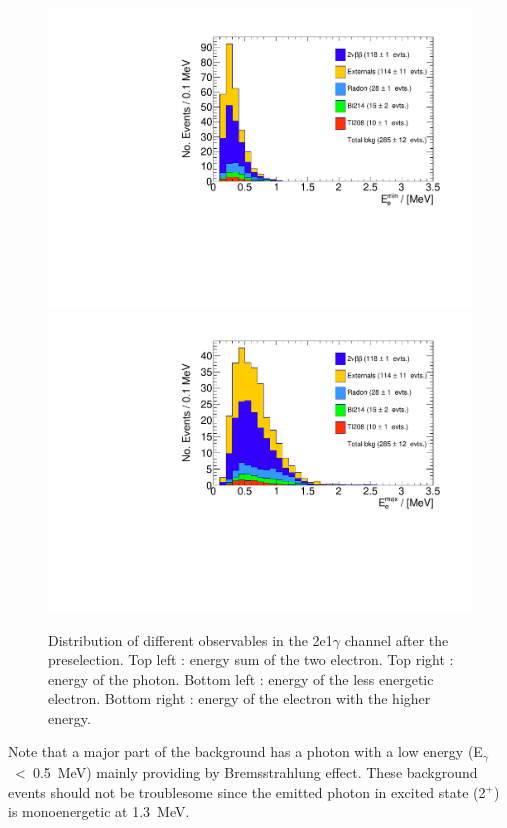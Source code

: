 \documentclass[main.tex]{subfiles}
\begin{document}
\begin{figure}[h!]
\includegraphics[scale=0.35]{pictures/FinalResults/bb2nu2/150/preselection/preSelection2e1gBKG_min_e_energy.pdf}
\includegraphics[scale=0.35]{pictures/FinalResults/bb2nu2/150/preselection/preSelection2e1gBKG_max_e_energy.pdf}
\caption{Distribution of different observables in the 2e1$\gamma$ channel after the preselection. Top left : energy sum of the two electron. Top right : energy of the photon. Bottom left : energy of the less energetic electron. Bottom right : energy of the electron with the higher energy.}
\label{preselection2e1g_150}
\end{figure}


\bigskip


\NI Note that a major part of the background has a photon with a low energy (E$_\gamma$~<~0.5~MeV) mainly providing by Bremsstrahlung effect. These background events should not be troublesome since the emitted photon in excited state (2$^+$) is monoenergetic at 1.3~MeV. 
\end{document}
